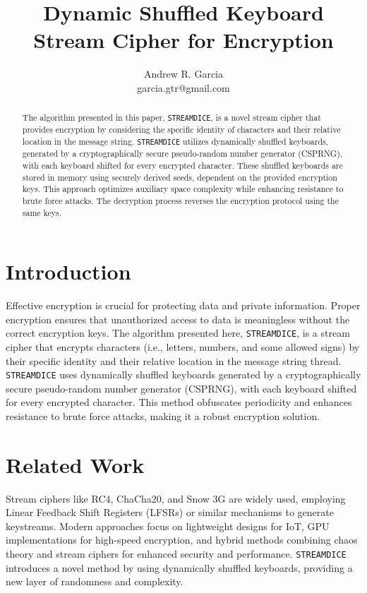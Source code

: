 \documentclass{article}
\title{Dynamic Shuffled Keyboard Stream Cipher for Encryption}
\author{Andrew R. Garcia\\garcia.gtr@gmail.com}
\date{}
\begin{document}
\maketitle

\begin{abstract}
The algorithm presented in this paper, \texttt{STREAMDICE}, is a novel stream cipher that provides encryption by considering the specific identity of characters and their relative location in the message string. \texttt{STREAMDICE} utilizes dynamically shuffled keyboards, generated by a cryptographically secure pseudo-random number generator (CSPRNG), with each keyboard shifted for every encrypted character. These shuffled keyboards are stored in memory using securely derived seeds, dependent on the provided encryption keys. This approach optimizes auxiliary space complexity while enhancing resistance to brute force attacks. The decryption process reverses the encryption protocol using the same keys.
\end{abstract}

\section{Introduction}
Effective encryption is crucial for protecting data and private information. Proper encryption ensures that unauthorized access to data is meaningless without the correct encryption keys. The algorithm presented here, \texttt{STREAMDICE}, is a stream cipher that encrypts characters (i.e., letters, numbers, and some allowed signs) by their specific identity and their relative location in the message string thread. \texttt{STREAMDICE} uses dynamically shuffled keyboards generated by a cryptographically secure pseudo-random number generator (CSPRNG), with each keyboard shifted for every encrypted character. This method obfuscates periodicity and enhances resistance to brute force attacks, making it a robust encryption solution.

\section{Related Work}
Stream ciphers like RC4, ChaCha20, and Snow 3G are widely used, employing Linear Feedback Shift Registers (LFSRs) or similar mechanisms to generate keystreams. Modern approaches focus on lightweight designs for IoT, GPU implementations for high-speed encryption, and hybrid methods combining chaos theory and stream ciphers for enhanced security and performance. \texttt{STREAMDICE} introduces a novel method by using dynamically shuffled keyboards, providing a new layer of randomness and complexity.
\end{document}
